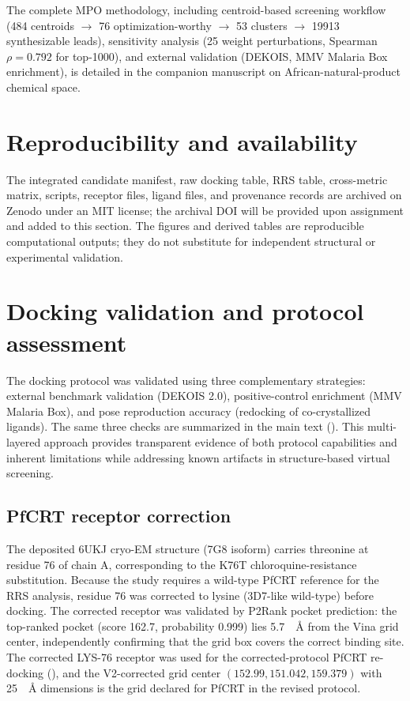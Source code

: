 \documentclass[journal=jcisd8,manuscript=suppinfo]{achemso}
\begin{document}
The complete MPO methodology, including centroid-based screening workflow (\num{484} centroids $\rightarrow$ \num{76} optimization-worthy $\rightarrow$ \num{53} clusters $\rightarrow$ \num{19913} synthesizable leads), sensitivity analysis (\num{25} weight perturbations, Spearman $\rho = \num{0.792}$ for top-1000), and external validation (DEKOIS, MMV Malaria Box enrichment), is detailed in the companion manuscript on African-natural-product chemical space.

\section{Reproducibility and availability}\label{sec:sm_repro}
The integrated candidate manifest, raw docking table, RRS table, cross-metric matrix, scripts, receptor files, ligand files, and provenance records are archived on Zenodo under an MIT license; the archival DOI will be provided upon assignment and added to this section. The figures and derived tables are reproducible computational outputs; they do not substitute for independent structural or experimental validation.

\section{Docking validation and protocol assessment}\label{sec:sm_validation}
The docking protocol was validated using three complementary strategies: external benchmark validation (DEKOIS 2.0), positive-control enrichment (MMV Malaria Box), and pose reproduction accuracy (redocking of co-crystallized ligands). The same three checks are summarized in the main text (). This multi-layered approach provides transparent evidence of both protocol capabilities and inherent limitations while addressing known artifacts in structure-based virtual screening.

\subsection{PfCRT receptor correction}\label{sec:sm_val_crt}
The deposited 6UKJ cryo-EM structure (7G8 isoform) carries threonine at residue 76 of chain A, corresponding to the K76T chloroquine-resistance substitution. Because the study requires a wild-type PfCRT reference for the RRS analysis, residue 76 was corrected to lysine (3D7-like wild-type) before docking. The corrected receptor was validated by P2Rank pocket prediction: the top-ranked pocket (score 162.7, probability 0.999) lies 5.7~\SI{}{\angstrom} from the Vina grid center, independently confirming that the grid box covers the correct binding site. The corrected LYS-76 receptor was used for the corrected-protocol PfCRT re-docking (), and the V2-corrected grid center $(\num{152.99}, \num{151.042}, \num{159.379})$ with 25~\SI{}{\angstrom} dimensions is the grid declared for PfCRT in the revised protocol.
\end{document}
